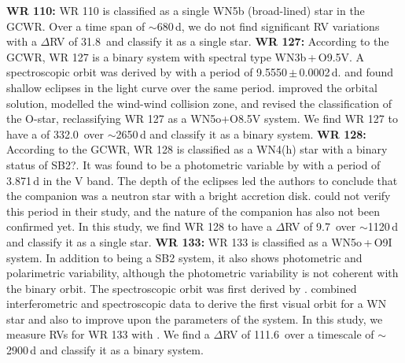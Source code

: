 \newline
\textbf{WR 110:} WR 110 is classified as a single WN5b (broad-lined) star in the GCWR. Over a time span of ${\sim}$680\,d, we do not find significant RV variations with a $\Delta$RV of 31.8\,\kms{} and classify it as a single star. 
\newline
\newline
\textbf{WR 127:} According to the GCWR, WR 127 is a binary system with spectral type WN3b\,+\,O9.5V. A spectroscopic orbit was derived by \citet{1981MasseyOrbits} with a period of 9.5550\,$\pm$\,0.0002\,d. \citet{1996Lamontagne} and \citet{1998MarchenkoMoffatPhotometry} found shallow eclipses in the light curve over the same period. \citet{2011delachevrotiere} improved the orbital solution, modelled the wind-wind collision zone, and revised the classification of the O-star, reclassifying WR 127 as a WN5o+O8.5V system. We find WR 127 to have a \DelRV{} of 332.0\,\kms{} over ${\sim}$2650\,d and classify it as a binary system.
\newline
\newline
\textbf{WR 128:} According to the GCWR, WR 128 is classified as a WN4(h) star with a binary status of SB2?. It was found to be a photometric variable by \citet{1985AntokhinCherepashchuk} with a period of 3.871\,d in the V band. The depth of the eclipses led the authors to conclude that the companion was a neutron star with a bright accretion disk. \citet{1986MoffatShara} could not verify this period in their study, and the nature of the companion has also not been confirmed yet. In this study, we find WR 128 to have a $\Delta$RV of 9.7\,\kms{} over ${\sim}$1120\,d and classify it as a single star. 
\newline
\newline
\textbf{WR 133:} WR 133 is classified as a WN5o\,+\,O9I system. In addition to being a SB2 system, it also shows photometric \citep{1998MarchenkoMoffatPhotometry} and polarimetric \citep{1989ARobert} variability, although the photometric variability is not coherent with the binary orbit. The spectroscopic orbit was first derived by \citet{1994UnderhillHill}. \citet{2021Richardson} combined interferometric and spectroscopic data to derive the first visual orbit for a WN star and also to improve upon the parameters of the system. In this study, we measure RVs for WR 133 with \NVred. We find a $\Delta$RV of 111.6\,\kms{} over a timescale of ${\sim}$2900\,d and classify it as a binary system.
\newline
\newline
